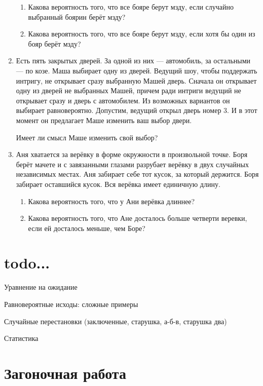 \documentclass[12pt]{article}
\theoremstyle{definition}
\begin{document}
\begin{enumerate}
\begin{enumerate}
  \item Какова вероятность того, что все бояре берут мзду, если случайно выбранный боярин берёт мзду?
  \item Какова вероятность того, что все бояре берут мзду, если хотя бы один из бояр берёт мзду?
\end{enumerate}
\item Есть пять закрытых дверей. За одной из них — автомобиль, за остальными — по козе.
Маша выбирает одну из дверей.
Ведущий шоу, чтобы поддержать интригу, не открывает сразу выбранную Машей дверь.
Сначала он открывает одну из дверей не выбранных Машей,
причем ради интриги ведущий не открывает сразу и дверь с автомобилем. Из возможных вариантов он выбирает равновероятно.
Допустим, ведущий открыл дверь номер 3. 
И в этот момент он предлагает Маше изменить ваш выбор двери.

Имеет ли смысл Маше изменить свой выбор?
\item Аня хватается за верёвку в форме окружности в произвольной точке.
Боря берёт мачете и с завязанными глазами разрубает
верёвку в двух случайных независимых местах. Аня забирает себе тот кусок,
за который держится. Боря забирает оставшийся кусок. Вся верёвка имеет единичную длину.
\begin{enumerate}
\item Какова вероятность того, что у Ани верёвка длиннее?
\item Какова вероятность того, что Ане досталось больше четверти веревки, если ей досталось меньше, чем Боре?
\end{enumerate}


\end{enumerate}


\section{todo...}

Уравнение на ожидание



Равновероятные исходы: сложные примеры

Случайные перестановки (заключенные, старушка, а-б-в, старушка два)

Статистика




\section{Загоночная работа}
\end{document}
